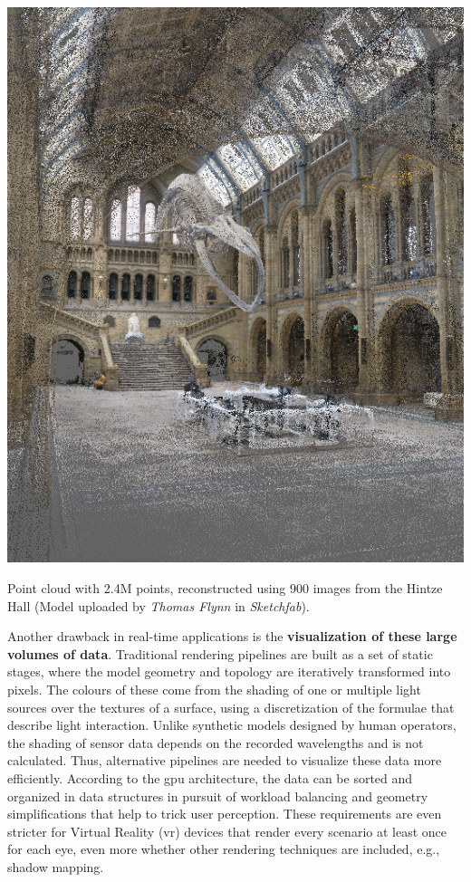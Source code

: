 \begin{marginfigure}[-.5cm]
	\includegraphics{figs/introduction/hintze.png}
	\caption{Point cloud with 2.4M points, reconstructed using 900 images from the Hintze Hall (Model uploaded by \textit{Thomas Flynn} in \textit{Sketchfab}).  }
	\label{fig:hintze_hall}
\end{marginfigure}
Another drawback in real-time applications is the \textbf{visualization of these large volumes of data}. Traditional rendering pipelines are built as a set of static stages, where the model geometry and topology are iteratively transformed into pixels. The colours of these come from the shading of one or multiple light sources over the textures of a surface, using a discretization of the formulae that describe light interaction. Unlike synthetic models designed by human operators, the shading of sensor data depends on the recorded wavelengths and is not calculated. Thus, alternative pipelines are needed to visualize these data more efficiently. According to the \acrshort{gpu} architecture, the data can be sorted and organized in data structures in pursuit of workload balancing and geometry simplifications that help to trick user perception. These requirements are even stricter for Virtual Reality (\acrshort{vr}) devices that render every scenario at least once for each eye, even more whether other rendering techniques are included, e.g., shadow mapping.  

